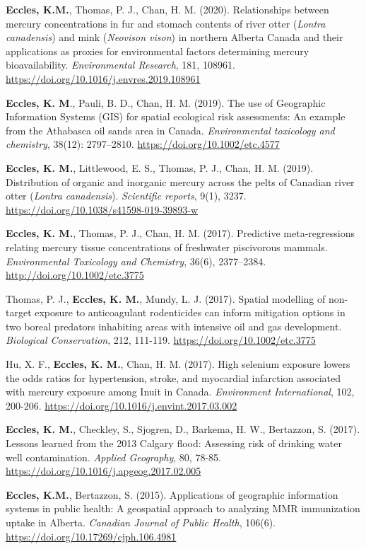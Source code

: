 \documentclass[margin,line]{res}
\begin{document}
\begin{resume}
\textbf{Eccles, K.M.}, Thomas, P. J., Chan, H. M. (2020). Relationships between mercury concentrations in fur and stomach contents of river otter (\textit{Lontra canadensis}) and mink (\textit{Neovison vison}) in northern Alberta Canada and their applications as proxies for environmental factors determining mercury bioavailability. \textit{Environmental Research}, 181, 108961. \url{https://doi.org/10.1016/j.envres.2019.108961}

\textbf{Eccles, K. M}., Pauli, B. D., Chan, H. M. (2019). The use of Geographic Information Systems (GIS) for spatial ecological risk assessments: An example from the Athabasca oil sands area in Canada. \textit{Environmental toxicology and chemistry}, 38(12): 2797–2810. \url{https://doi.org/10.1002/etc.4577}

\textbf{Eccles, K. M.}, Littlewood, E. S., Thomas, P. J., Chan, H. M. (2019). Distribution of organic and inorganic mercury across the pelts of Canadian river otter (\textit{Lontra canadensis}). \textit{Scientific reports}, 9(1), 3237. \url{https://doi.org/10.1038/s41598-019-39893-w}

 \textbf{Eccles, K. M.}, Thomas, P. J., Chan, H. M. (2017). Predictive meta-regressions relating mercury tissue concentrations of freshwater piscivorous mammals. \textit{Environmental Toxicology and Chemistry}, 36(6), 2377–2384. \url{http://doi.org/10.1002/etc.3775}

Thomas, P. J., \textbf{Eccles, K. M.}, Mundy, L. J. (2017). Spatial modelling of non-target exposure to anticoagulant rodenticides can inform mitigation options in two boreal predators inhabiting areas with intensive oil and gas development. \textit{Biological Conservation}, 212, 111-119. \url{https://doi.org/10.1002/etc.3775}

Hu, X. F., \textbf{Eccles, K. M.}, Chan, H. M. (2017). High selenium exposure lowers the odds ratios for hypertension, stroke, and myocardial infarction associated with mercury exposure among Inuit in Canada. \textit{Environment International}, 102, 200-206. \url{https://doi.org/10.1016/j.envint.2017.03.002}

\textbf{Eccles, K. M.}, Checkley, S., Sjogren, D., Barkema, H. W., Bertazzon, S. (2017). Lessons learned from the 2013 Calgary flood: Assessing risk of drinking water well contamination. \textit{Applied Geography}, 80, 78-85. \url{https://doi.org/10.1016/j.apgeog.2017.02.005}

\textbf{Eccles, K.M.}, Bertazzon, S. (2015). Applications of geographic information systems in public health: A geospatial approach to analyzing MMR immunization uptake in Alberta. \textit{Canadian Journal of Public Health}, 106(6). \url{https://doi.org/10.17269/cjph.106.4981}


\end{resume}
\end{document}
